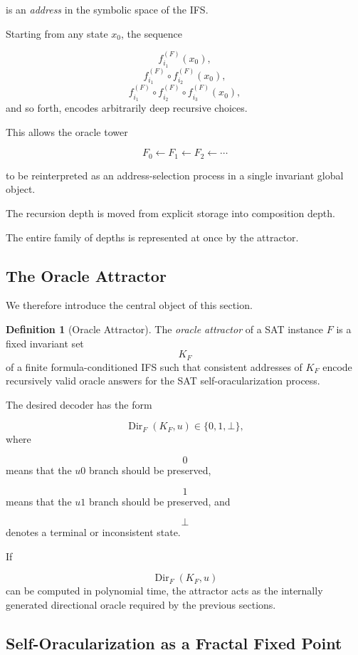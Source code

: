 \documentclass[11pt]{article}
\theoremstyle{plain}
\theoremstyle{definition}
\newtheorem{definition}[theorem]{Definition}
\begin{document}
is an \emph{address} in the symbolic space of the IFS.

Starting from any state \(x_0\), the sequence

\[
    f_{i_1}^{(F)}(x_0),
\]
\[
    f_{i_1}^{(F)}
    \circ
    f_{i_2}^{(F)}(x_0),
\]
\[
    f_{i_1}^{(F)}
    \circ
    f_{i_2}^{(F)}
    \circ
    f_{i_3}^{(F)}(x_0),
\]
and so forth, encodes arbitrarily deep recursive choices.

This allows the oracle tower

\[
    F_0
    \leftarrow
    F_1
    \leftarrow
    F_2
    \leftarrow
    \cdots
\]

to be reinterpreted as an address-selection process in a single invariant
global object.

The recursion depth is moved from explicit storage into composition depth.

The entire family of depths is represented at once by the attractor.

\subsection{The Oracle Attractor}

We therefore introduce the central object of this section.

\begin{definition}[Oracle Attractor]
\label{def:oracle-attractor}
The \emph{oracle attractor} of a SAT instance \(F\) is a fixed invariant set
\[
    K_F
\]
of a finite formula-conditioned IFS such that consistent addresses of \(K_F\)
encode recursively valid oracle answers for the SAT self-oracularization
process.
\end{definition}

The desired decoder has the form

\[
    \operatorname{Dir}_F(K_F,u)
    \in
    \{0,1,\bot\},
\]
where

\[
    0
\]
means that the \(u0\) branch should be preserved,

\[
    1
\]
means that the \(u1\) branch should be preserved, and

\[
    \bot
\]
denotes a terminal or inconsistent state.

If

\[
    \operatorname{Dir}_F(K_F,u)
\]
can be computed in polynomial time, the attractor acts as the internally
generated directional oracle required by the previous sections.

\subsection{Self-Oracularization as a Fractal Fixed Point}
\end{document}
